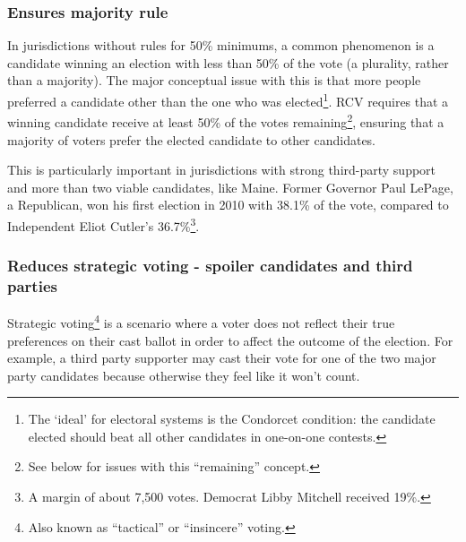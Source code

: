 \documentclass[12pt,twoside]{reedthesis}
\begin{document}
\hypertarget{ensures-majority-rule}{%
\subsubsection{Ensures majority rule}\label{ensures-majority-rule}}

In jurisdictions without rules for 50\% minimums, a common phenomenon is a candidate winning an election with less than 50\% of the vote (a plurality, rather than a majority). The major conceptual issue with this is that more people preferred a candidate other than the one who was elected\footnote{The `ideal' for electoral systems is the Condorcet condition: the candidate elected should beat all other candidates in one-on-one contests.}. RCV requires that a winning candidate receive at least 50\% of the votes remaining\footnote{See below for issues with this ``remaining'' concept.}, ensuring that a majority of voters prefer the elected candidate to other candidates.

This is particularly important in jurisdictions with strong third-party support and more than two viable candidates, like Maine. Former Governor Paul LePage, a Republican, won his first election in 2010 with 38.1\% of the vote, compared to Independent Eliot Cutler's 36.7\%\footnote{A margin of about 7,500 votes. Democrat Libby Mitchell received 19\%.}.

\hypertarget{reduces-strategic-voting---spoiler-candidates-and-third-parties}{%
\subsubsection{Reduces strategic voting - spoiler candidates and third parties}\label{reduces-strategic-voting---spoiler-candidates-and-third-parties}}

Strategic voting\footnote{Also known as ``tactical'' or ``insincere'' voting.} is a scenario where a voter does not reflect their true preferences on their cast ballot in order to affect the outcome of the election. For example, a third party supporter may cast their vote for one of the two major party candidates because otherwise they feel like it won't count.
\end{document}
